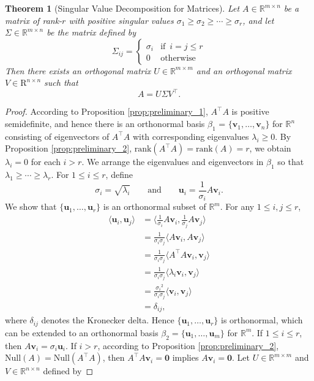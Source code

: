 \documentclass[12pt]{article}
\newtheorem{theorem}{Theorem}[subsection]
\theoremstyle{definition}
\begin{document}
\begin{theorem}[Singular Value Decomposition for Matrices] \label{thm:svd}
    Let $A\in\mathbb{R}^{m\times n}$ be a matrix of rank-$r$ with positive singular values $\sigma_1 \geq \sigma_2 \geq \cdots \geq \sigma_r$, and let $\Sigma\in\mathbb{R}^{m\times n}$ be the matrix defined by
    \[ \Sigma_{ij} =
    \begin{cases}
        \sigma_i &\text{if }\,i=j\leq r \\
        0 &\text{otherwise}
    \end{cases}
    \]
    Then there exists an orthogonal matrix $U\in\mathbb{R}^{m\times m}$ and an orthogonal matrix $V\in\mathrm{R}^{n\times n}$ such that
    \[ A = U\Sigma V^\top. \]
\end{theorem}

\begin{proof}
    According to Proposition \ref{prop:preliminary_1}, $A^\top A$ is positive semidefinite, and hence there is an orthonormal basis $\beta_1$ = $\{\mathbf{v}_1, \ldots, \mathbf{v}_n\}$ for $\mathbb{R}^n$ consisting of eigenvectors of $A^\top A$ with corresponding eigenvalues $\lambda_i \geq 0$. By Proposition \ref{prop:preliminary_2}, $\mathrm{rank}(A^\top A) = \mathrm{rank}(A) = r$, we obtain $\lambda_i = 0$ for each $i > r$. We arrange the eigenvalues and eigenvectors in $\beta_1$ so that $\lambda_1 \geq \cdots \geq \lambda_r$. For $1\leq i\leq r$, define
    \[ \sigma_i = \sqrt{\lambda_i} \qquad \text{and} \qquad
    \mathbf{u}_i = \frac{1}{\sigma_i} A\mathbf{v}_i.
    \]
    We show that $\{\mathbf{u}_1, \ldots, \mathbf{u}_r\}$ is an orthonormal subset of $\mathbb{R}^m$. For any $1\leq i,j\leq r$,
    \[
    \begin{aligned}
        \langle \mathbf{u}_i,\mathbf{u}_j\rangle
        &= \Big\langle \frac{1}{\sigma_i}A\mathbf{v}_i,\frac{1}{\sigma_j}A\mathbf{v}_j \Big\rangle\\
        &= \frac{1}{\sigma_i\sigma_j} \langle A\mathbf{v}_i, A\mathbf{v}_j\rangle \\
        &= \frac{1}{\sigma_i\sigma_j} \langle A^\top A\mathbf{v}_i, \mathbf{v}_j \rangle \\
        &= \frac{1}{\sigma_i\sigma_j} \langle \lambda_i \mathbf{v}_i, \mathbf{v}_j \rangle \\
        &= \frac{{\sigma_i}^2}{\sigma_i\sigma_j} \langle \mathbf{v}_i, \mathbf{v}_j \rangle \\
        &= \delta_{ij},
    \end{aligned}
    \]
    where $\delta_{ij}$ denotes the Kronecker delta. Hence $\{\mathbf{u}_1, \ldots, \mathbf{u}_r\}$ is orthonormal, which can be extended to an orthonormal basis $\beta_2 = \{\mathbf{u}_1,\ldots, \mathbf{u}_m\}$ for $\mathbb{R}^m$. If $1\leq i\leq r$, then $A\mathbf{v}_i = \sigma_i \mathbf{u}_i$. If $i>r$, according to Proposition \ref{prop:preliminary_2}, $\mathrm{Null}(A) = \mathrm{Null}(A^\top A)$, then $A^\top A \mathbf{v}_i = \mathbf{0}$ implies $A\mathbf{v}_i = \mathbf{0}$. Let $U\in\mathbb{R}^{m\times m}$ and $V\in\mathbb{R}^{n\times n}$ defined by

\end{proof}
\end{document}
